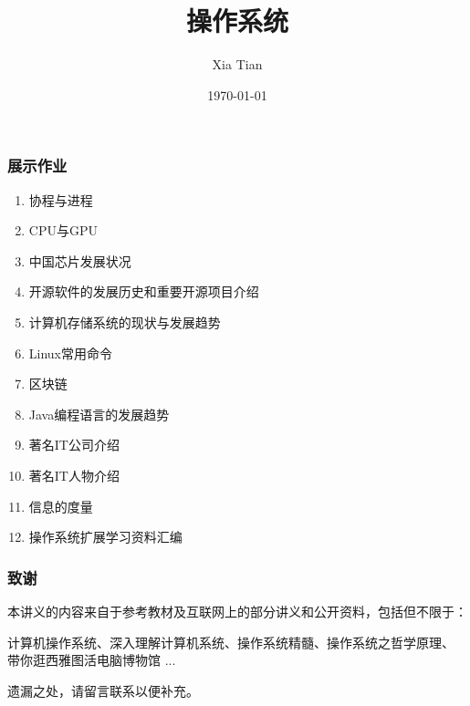 \documentclass[table, t,13pt]{beamer}
\begin{document}
  \title{操作系统}
  \author{Xia Tian }
  \date{\today{}}

  \frame{\titlepage}

% 
%
% 
% 
% 


  \begin{frame}
    \frametitle{展示作业}
    \begin{enumerate}
    \item 协程与进程
    \item CPU与GPU
    \item 中国芯片发展状况
    \item 开源软件的发展历史和重要开源项目介绍
    \item 计算机存储系统的现状与发展趋势
    \item Linux常用命令
    \item 区块链
    \item Java编程语言的发展趋势
    \item 著名IT公司介绍
    \item 著名IT人物介绍
    \item 信息的度量
    \item 操作系统扩展学习资料汇编 
    \end{enumerate}
  \end{frame}

\begin{frame}[fragile]
  \frametitle{致谢}

  本讲义的内容来自于参考教材及互联网上的部分讲义和公开资料，包括但不限于：

  计算机操作系统、深入理解计算机系统、操作系统精髓、操作系统之哲学原理、
  带你逛西雅图活电脑博物馆 ...

  遗漏之处，请留言联系以便补充。
\end{frame}
\end{document}
